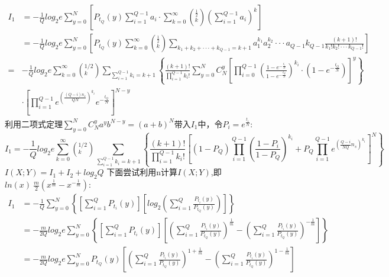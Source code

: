 \documentclass[12pt]{article}
\begin{document}
\begin{equation*}
  \begin{aligned}
    I_1 &= -\frac{1}{Q}log_2e\sum\limits_{y=0}^{N}\left[P_{t_Q}(y)\sum\limits_{i=1}^{Q-1}a_i·\sum\limits_{k=0}^{\infty}\left(^{\frac{1}{2}}_k\right)\left(\sum\limits_{i=1}^{Q-1}a_i\right)^{k}\right] \\
    &= -\frac{1}{Q}log_2e\sum\limits_{y=0}^{N}\left[P_{t_Q}(y)\sum\limits_{k=0}^{\infty}\left(^{\frac{1}{2}}_k\right)\sum\limits_{k_1+k_2+···+k_{Q-1}=k+1}a_1^{k_1}a_2^{k_2}···a_{Q-1}k_{Q-1}\frac{(k+1)!}{k_1!k_2!···k_{Q-1}!}\right] \\
    =& -\frac{1}{Q}log_2e\sum\limits_{k=0}^{\infty}\left(^{1/2}_k\right)\sum\limits_{\sum_{i=1}^{Q-1}k_i=k+1}\left\{\frac{(k+1)!}{\prod_{i=1}^{Q-1}k_i!}\sum\limits_{y=0}^NC_N^y\left[\prod_{i=0}^{Q-1}\left(\frac{1-e^{-\frac{t_i}{N}}}{1-e^{-\frac{t_Q}{N}}}\right)^{k_i}·\left(1-e^{-\frac{t_Q}{N}}\right)\right]^y\right\} \\
    &·\left[\prod_{i=1}^{Q-1}e^{\left(\frac{(Q-i)n_s}{QN}\right)^{k_i}}e^{-\frac{t_Q}{N}}\right]^{N-y}
  \end{aligned}
\end{equation*}
利用二项式定理$\sum_{y=0}^NC_N^ya^yb^{N-y}=(a+b)^N$带入$I_1$中，令$P_i=e^{\frac{t_i}{N}}$:
$$I_1=-\frac{1}{Q}log_2e\sum\limits_{k=0}^\infty\left(^{1/2}_k\right)\sum\limits_{\sum_{i=1}^{Q-1}k_i=k+1}\left\{\frac{(k+1)!}{\prod_{i=1}^{Q-1}k_i!}\left[(1-P_Q)\prod_{i=1}^{Q-1}\left(\frac{1-P_i}{1-P_Q}\right)^{k_i}+P_Q\prod_{i=1}^{Q-1}e^{\left(\frac{Q-i}{NQ}n_s\right)^{k_i}}\right]^N\right\}$$
$I(X;Y)=I_1+I_2+log_2Q$
下面尝试利用n计算$I(X;Y)$,即$ln(x)~\frac{m}{2}\left(x^{\frac{1}{m}}-x^{-\frac{1}{m}}\right)$:
\begin{equation*}
  \begin{aligned}
    I_1 &= -\frac{1}{Q}\sum\limits_{y=0}^N\left\{\left[\sum\limits_{i=1}^QP_{t_i}(y)\right]\left[log_2\left(\sum\limits_{i=1}^Q\frac{P_{t_i}(y)}{P_{t_Q}(y)}\right)\right]\right\} \\
    &=-\frac{m}{2Q}log_2e\sum\limits_{y=0}^N\left\{\left[\sum\limits_{i=1}^QP_{t_i}(y)\right]\left[\left(\sum\limits_{i=1}^Q\frac{P_{t_i}(y)}{P_{t_Q}(y)}\right)^{\frac{1}{m}}-\left(\sum\limits_{i=1}^Q\frac{P_{t_i}(y)}{P_{t_Q}(y)}\right)^{-\frac{1}{m}}\right]\right\} \\
    &=-\frac{m}{2Q}log_2e\sum\limits_{y=0}^NP_{t_Q}(y)\left[\left(\sum\limits_{i=1}^Q\frac{P_{t_i}(y)}{P_{t_Q}(y)}\right)^{1+\frac{1}{m}}-\left(\sum\limits_{i=1}^Q\frac{P_{t_i}(y)}{P_{t_Q}(y)}\right)^{1-\frac{1}{m}}\right]
  \end{aligned}
\end{equation*}
\end{document}
